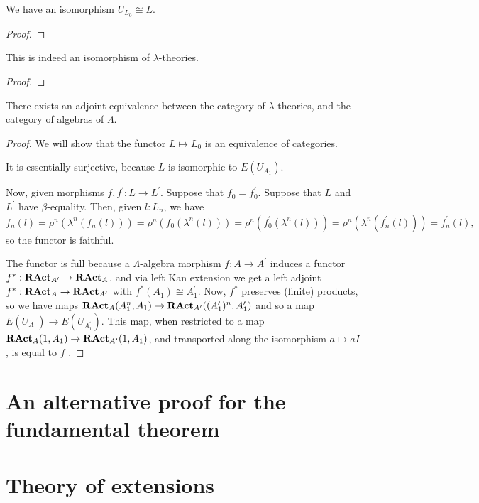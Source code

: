 \begin{lemma}
  We have an isomorphism $ U_{L_0} \cong L $.
\end{lemma}
\begin{proof}
  \TODO
\end{proof}

\begin{lemma}
  This is indeed an isomorphism of $ \lambda $-theories.
\end{lemma}
\begin{proof}
  \TODO
\end{proof}

\begin{theorem}
  There exists an adjoint equivalence between the category of $ \lambda $-theories, and the category of algebras of $ \Lambda $.
\end{theorem}
\begin{proof}
  We will show that the functor $ L \mapsto L_0 $ is an equivalence of categories.

  It is essentially surjective, because $ L $ is isomorphic \TODO to $ E(U_{A_1}) $.

  Now, given morphisms $ f, f^\prime: L \to L^\prime $. Suppose that $ f_0 = f^\prime_0 $. Suppose that $ L $ and $ L^\prime $ have $ \beta $-equality. Then, given $ l: L_n $, we have
  \[ f_n(l) = \rho^n(\lambda^n(f_n(l))) = \rho^n(f_0(\lambda^n(l))) = \rho^n(f^\prime_0(\lambda^n(l))) = \rho^n(\lambda^n(f^\prime_n(l))) = f^\prime_n(l), \]
  so the functor is faithful.

  The functor is full because a $ \Lambda $-algebra morphism $ f: A \to A^\prime $ induces a functor $ f^*: \mathbf{RAct}_{A^\prime} \to \mathbf{RAct}_{A} $, and via left Kan extension we get a left adjoint $ f^*: \mathbf{RAct}_{A} \to \mathbf{RAct}_{A^\prime} $ with $ f^*(A_1) \cong A^\prime_1 $. Now, $ f^* $ preserves (finite) products, so we have maps $ \mathbf{RAct}_{A}(A_1^n, A_1) \to \mathbf{RAct}_{A^\prime}((A^\prime_1)^n, A^\prime_1) $ and so a map $ E(U_{A_1}) \to E(U_{A^\prime_1}) $. This map, when restricted to a map $ \mathbf{RAct}_{A}(1, A_1) \to \mathbf{RAct}_{A^\prime}(1, A_1) $, and transported along the isomorphism $ a \mapsto a I $ \TODO, is equal to $ f $ \TODO.
\end{proof}


\section{An alternative proof for the fundamental theorem}


\section{Theory of extensions}

